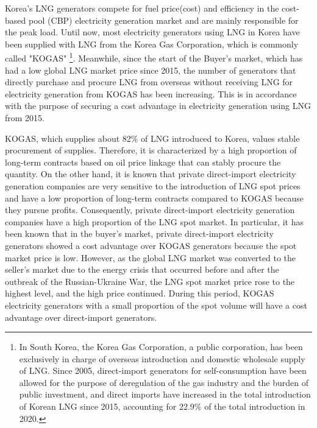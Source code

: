 \documentclass[12pt]{article}
\begin{document}
Korea's LNG generators compete for fuel price(cost) and efficiency in the cost-based pool (CBP) electricity generation market and are mainly responsible for the peak load. Until now, most electricity generators using LNG in Korea have been supplied with LNG from the Korea Gas Corporation, which is commonly called "KOGAS" \footnote{In South Korea, the Korea Gas Corporation, a public corporation, has been exclusively in charge of overseas introduction and domestic wholesale supply of LNG. Since 2005, direct-import generators for self-consumption have been allowed for the purpose of deregulation of the gas industry and the burden of public investment, and direct imports have increased in the total introduction of Korean LNG since 2015, accounting for 22.9\% of the total introduction in 2020.}. Meanwhile, since the start of the Buyer's market, which has had a low global LNG market price since 2015, the number of generators that directly purchase and procure LNG from overseas without receiving LNG for electricity generation from KOGAS has been increasing. This is in accordance with the purpose of securing a cost advantage in electricity generation using LNG from 2015.

KOGAS, which supplies about 82\% of LNG introduced to Korea, values stable procurement of supplies. Therefore, it is characterized by a high proportion of long-term contracts based on oil price linkage that can stably procure the quantity. On the other hand, it is known that private direct-import electricity generation companies are very sensitive to the introduction of LNG spot prices and have a low proportion of long-term contracts compared to KOGAS because they pursue profits. Consequently, private direct-import electricity generation companies have a high proportion of the LNG spot market. In particular, it has been known that in the buyer's market, private direct-import electricity generators showed a cost advantage over KOGAS generators because the spot market price is low. However, as the global LNG market was converted to the seller's market due to the energy crisis that occurred before and after the outbreak of the Russian-Ukraine War, the LNG spot market price rose to the highest level, and the high price continued. During this period, KOGAS electricity generators with a small proportion of the spot volume will have a cost advantage over direct-import generators.
\end{document}
